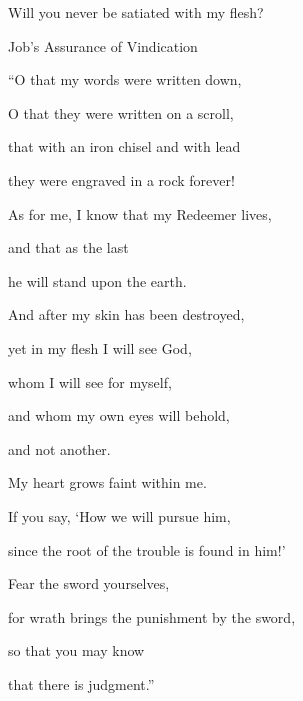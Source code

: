 {\par }{\Q Will you never be satiated
with my flesh?
\par }{\SH Job’s Assurance of Vindication
\par }{\Q {}“O
that my words
were written
down,
\par }{\Q O that they were written
on a scroll,
\par }{\Q {}that with an iron
chisel
and with lead
\par }{\Q they were engraved
in a rock
forever!
\par }{\Q {}As for me, I
know
that my Redeemer
lives,
\par }{\Q and that as the last
\par }{\Q he will stand
upon the earth.
\par }{\Q {}And after
my skin
has been destroyed,
\par }{\Q yet
in my flesh
I will see
God,
\par }{\Q {}whom
I
will see
for myself,
\par }{\Q and whom my own eyes
will behold,
\par }{\Q and not
another.
\par }{\Q My heart grows faint within me.
\par }{\Q {}If
you say,
‘How
we will pursue
him,
\par }{\Q since the root
of the trouble
is found in him!’
\par }{\Q {}Fear
the sword
yourselves,
\par }{\Q for
wrath
brings the punishment
by the sword,
\par }{\Q so that you may
know
\par }{\Q that there is judgment.”


}
